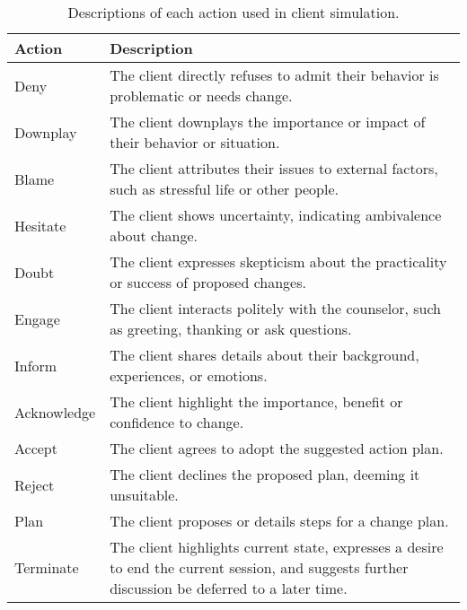\begin{table*}[tb]
\centering
\begin{tabularx}{\textwidth}{lX}
\toprule
Action      & Description                                                                                                                                      \\ \midrule
Deny        & The client directly refuses to admit their behavior is problematic or needs change.                                                              \\ \hline
Downplay    & The client downplays the importance or impact of their behavior or situation.                                                                    \\ \hline
Blame       & The client attributes their issues to external factors, such as stressful life or other people.                                                  \\ \hline
Hesitate    & The client shows uncertainty, indicating ambivalence about change.                                                                               \\ \hline
Doubt       & The client expresses skepticism about the practicality or success of proposed changes.                                                           \\ \hline
Engage      & The client interacts politely with the counselor, such as greeting, thanking or ask questions.                                                   \\ \hline
Inform      & The client shares details about their background, experiences, or emotions.                                                                      \\ \hline
Acknowledge & The client highlight the importance, benefit or confidence to change.                                                                            \\ \hline
Accept      & The client agrees to adopt the suggested action plan.                                                                                            \\ \hline
Reject      & The client declines the proposed plan, deeming it unsuitable.                                                                                    \\  \hline
Plan        & The client proposes or details steps for a change plan.                                                                                          \\ \hline
Terminate   & The client highlights current state, expresses a desire to end the current session, and suggests further discussion be deferred to a later time. \\ \bottomrule
\end{tabularx}
\caption{Descriptions of each action used in client simulation.}
\label{tab:action description}
\end{table*}

